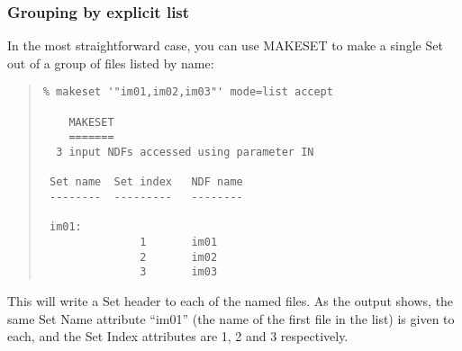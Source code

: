 \documentclass[twoside,11pt]{article}
\newcommand{\htmlref}[2]{#1}
\newcommand{\latexhtml}[2]{#1}
\renewcommand{\_}{\texttt{\symbol{95}}}
\newcommand{\ttsize}{\latexhtml{\small}{}}
\newenvironment{myquote}{\begin{quote}\ttsize}{\end{quote}}
\newcommand{\xroutine}[1]{\htmlref{{\sc #1}}{#1}}
\begin{document}
\subsubsection{\label{makeset_list}Grouping by explicit list}

In the most straightforward case, you can use \xroutine{MAKESET} 
to make a single Set out of a group of files listed by name:
\begin{myquote}
\begin{verbatim}
% makeset '"im01,im02,im03"' mode=list accept

    MAKESET
    =======
  3 input NDFs accessed using parameter IN

 Set name  Set index   NDF name
 --------  ---------   --------

 im01:
               1       im01
               2       im02
               3       im03
\end{verbatim}
\end{myquote}
This will write a Set header to each of the named files.
As the output shows, the same Set Name attribute ``im01'' 
(the name of the first file in the list) is given to each, 
and the Set Index attributes are 1, 2 and 3 respectively.
\end{document}
